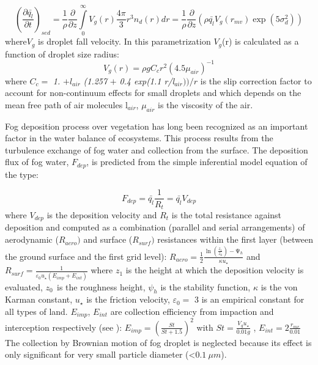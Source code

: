 \begin{equation}
\left( \frac{\partial \bar{q_{l}}}{\partial t} \right)_{sed}=\frac{1}{\rho
}\frac{\partial }{\partial z}\int\limits_0^\infty {V_{g}\left( r
\right)\frac{4\pi }{3}r^{3}n_{d}\left( r \right)dr} =\frac{1}{\rho
}\frac{\partial }{\partial z}\left( \rho \bar{q_{l}}V_{g}\left( r_{mv}
\right)\exp \left( 5\sigma_{d}^{2} \right) \right)
\end{equation}
\newline
where$ V_{g}$ is droplet fall velocity.
\newline
In this parametrization $V_{g}$(r) is calculated as a function of droplet
size radius:
\begin{equation}
V_{g}\left( r \right)=\rho gC_{c}r^{2}\left( 4.5\mu_{air} \right)^{-1}
\end{equation}
where $C_{c} =$\textit{ 1. }$+ l_{air}$\textit{ (1.257 }$+$\textit{ 0.4 exp(1.1 r/l}$_{air}))/r$ is the slip correction factor to
account for non-continuum effects for small droplets and which depends on
the mean free path of air molecules l$_{air}$, $\mu_{air}$ is the
viscosity of the air.

Fog deposition process over vegetation has long been recognized as an
important factor in the water balance of ecosystems. This process results
from the turbulence exchange of fog water and collection from the surface.
The deposition flux of fog water, $F_{dep}$, is predicted from the simple
inferential model equation of the type:

\begin{equation}
F_{dep}=\bar{q_{l}}\frac{1}{R_{t}}=\bar{q_{l}}V_{dep}
\end{equation}
where $V_{dep}$ is the deposition velocity and $R_{t}$ is the total resistance
against deposition and computed as a combination (parallel and serial
arrangements) of aerodynamic ($R_{aero})$ and surface ($R_{surf})$ resistances
within the first layer (between the ground surface and the first grid level):
\newline
$R_{aero}=\frac{1}{2}\frac{\ln \left( \frac{z_{1}}{z_{0}}
\right)-\mathrm{\Psi }_{h}}{\kappa u_{\star }}$ and
$R_{surf}=\frac{1}{\varepsilon_{0}u_{\star }\left( E_{imp}+E_{int} \right)}$
\newline
where $z_{1}$ is the height at which the deposition velocity is evaluated,
$z_{0\, }$ is the roughness height, $\psi_{h}$ is the stability function,
$\kappa $ is the von Karman constant, $u_{\star }$ is the friction velocity,
$\varepsilon_{0}=$ 3 is an empirical constant for all types of land.
$E_{imp}$, $E_{int}$ are collection efficiency from impaction and interception
respectively (see \cite{Zhang:2001} ):
\newline
\newline
$E_{imp}=\left( \frac{St}{St+1.5} \right)^{2}$ with $St=\frac{V_{g}u_{\star
}}{0.01g}$ , $E_{int}=2\frac{r_{mv}}{0.01}$
\newline
\newline
The collection by Brownian motion of fog droplet is neglected because its
effect is only significant for very small particle diameter (\textless $\SI{0.1}{\mu m}$).

